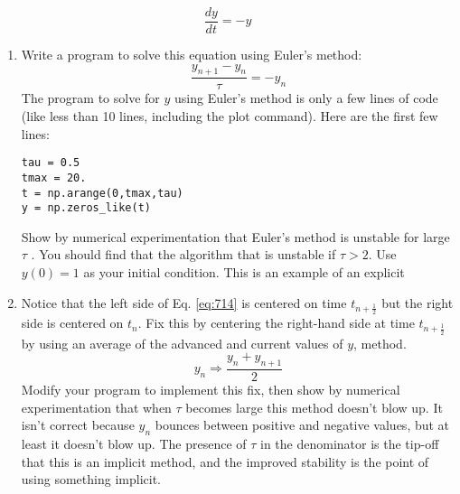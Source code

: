 \begin{equation}\label{eq:713}
\frac{dy}{dt	} = -y
\end{equation}
\begin{problem}\label{P7.2}
\begin{enumerate}[label=(\alph*)]
\item Write a program to solve this equation using Euler\rq s method:
\begin{equation}\label{eq:714}
\frac{y_{n+1}-y_n}{\tau} = -y_n
\end{equation}
The program to solve for $y$ using Euler\rq s method is only a few lines of
code (like less than 10 lines, including the plot command). Here are
the first few lines:
\begin{lstlisting}
tau = 0.5
tmax = 20.
t = np.arange(0,tmax,tau)
y = np.zeros_like(t)
\end{lstlisting}
Show by numerical experimentation that Euler\rq s method is unstable
for large $\tau$ . You should find that the algorithm that is unstable if $\tau > 2$.
Use $y(0) = 1$ as your initial condition. This is an example of an explicit
\item Notice that the left side of Eq. \eqref{eq:714} is centered on time $t_{n+\frac{1}{2}}$ but the
right side is centered on $t_n$. Fix this by centering the right-hand side at time $t_{n+\frac{1}{2}}$ by using an average of the advanced and current values of $y$, method.
\begin{equation*}
y_{n} \Rightarrow \frac{y_{n}+y_{n+1}}{2}
\end{equation*}
Modify your program to implement this fix, then show by numerical
experimentation that when $\tau$ becomes large this method doesn\rq t blow
up. It isn\rq t correct because $y_n$ bounces between positive and negative
values, but at least it doesn\rq t blow up. The presence of $\tau$ in the denominator is the tip-off that this is an implicit method, and the improved
stability is the point of using something implicit.


\end{enumerate}
\end{problem}
